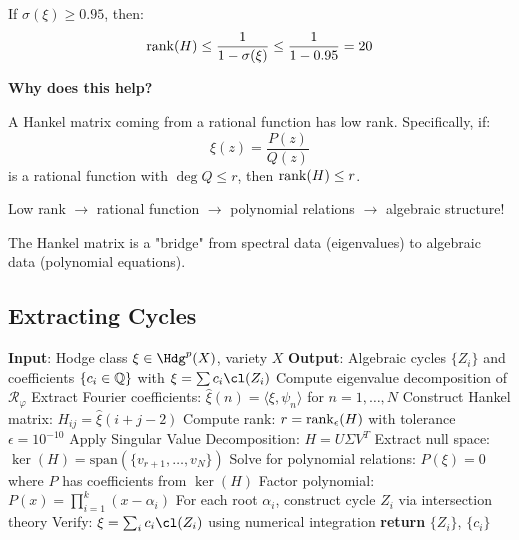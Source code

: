 \begin{theorem}\label{thm:low-rank}
If $\sigma(\xi) \geq 0.95$, then:
\begin{equation}
\rank(H) \leq \frac{1}{1-\sigma(\xi)} \leq \frac{1}{1-0.95} = 20
\end{equation}
\end{theorem}

\begin{intuitive}
\textbf{Why does this help?}

A Hankel matrix coming from a rational function has low rank. Specifically, if:
\begin{equation}
\xi(z) = \frac{P(z)}{Q(z)}
\end{equation}
is a rational function with $\deg Q \leq r$, then $\rank(H) \leq r$.

Low rank $\to$ rational function $\to$ polynomial relations $\to$ algebraic structure!

The Hankel matrix is a "bridge" from spectral data (eigenvalues) to algebraic data (polynomial equations).
\end{intuitive}

\subsection{Extracting Cycles}

\begin{algorithm}
\caption{Extract Algebraic Cycles from Hodge Class}
\label{alg:cycle-extraction}
\begin{algorithmic}[1]
\STATE \textbf{Input}: Hodge class $\xi \in \Hdg^p(X)$, variety $X$
\STATE \textbf{Output}: Algebraic cycles $\{Z_i\}$ and coefficients $\{c_i \in \mathbb{Q}\}$ with $\xi = \sum c_i \cl(Z_i)$
\STATE
\STATE Compute eigenvalue decomposition of $\mathcal{R}_\varphi$
\STATE Extract Fourier coefficients: $\hat{\xi}(n) = \langle \xi, \psi_n \rangle$ for $n = 1, \ldots, N$
\STATE Construct Hankel matrix: $H_{ij} = \hat{\xi}(i+j-2)$
\STATE Compute rank: $r = \rank_{\epsilon}(H)$ with tolerance $\epsilon = 10^{-10}$
\STATE Apply Singular Value Decomposition: $H = U \Sigma V^T$
\STATE Extract null space: $\ker(H) = \text{span}(\{v_{r+1}, \ldots, v_N\})$
\STATE Solve for polynomial relations: $P(\xi) = 0$ where $P$ has coefficients from $\ker(H)$
\STATE Factor polynomial: $P(x) = \prod_{i=1}^{k} (x - \alpha_i)$
\STATE For each root $\alpha_i$, construct cycle $Z_i$ via intersection theory
\STATE Verify: $\xi = \sum_{i} c_i \cl(Z_i)$ using numerical integration
\STATE \textbf{return} $\{Z_i\}$, $\{c_i\}$
\end{algorithmic}
\end{algorithm}

